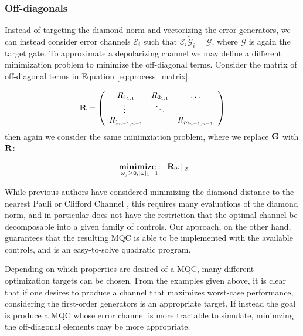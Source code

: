 \documentclass[aps,nofootinbib,pra,notitlepage,twocolumn]{revtex4-1}
\newcommand{\actual}{\ensuremath{\tilde{\mathcal{G}}}}
\newcommand{\target}{\ensuremath{{\mathcal{G}}}}
\newcommand{\error}{\ensuremath{{\mathcal{E}}}}
\begin{document}


\subsubsection{Off-diagonals} %
\label{sub:off_diagonals}
Instead of targeting the diamond norm and vectorizing the error generators, we can instead consider error channels $\error_i$ such that $\error_i\actual_i=\target$, where $\target$ is again the target gate. To approximate a depolarizing channel we may define a different minimization problem to  minimize the off-diagonal terms. Consider the matrix of off-diagonal terms in Equation \ref{eq:process_matrix}:

\begin{equation}\label{eq:vectorized_off_diagonal}
	\bold{R} = \left(\begin{array}{cccc}
		R_{1_{1,1}} & R_{2_{1,1}} & \ldots   \\ 
		\vdots\ & \ddots &    \\
		R_{1_{n-1,n-1}} &  &  R_{m_{n-1,n-1}} \\ 
	\end{array} 	
	\right)
\end{equation}
then again we consider the same minimziation problem, where we replace $\bold{G}$ with $\bold{R}$:

\begin{equation}\label{eq:minimization_diagonal}
  \begin{split}
    &\underset{\omega_j\geq0, |\omega|_1=1}{\textbf{minimize}: } ||\bold{R}\omega||_2\\
  \end{split}
\end{equation}

While previous authors have considered minimizing the diamond distance to the nearest Pauli or Clifford Channel \cite{Magesan2013}, this requires many evaluations of the diamond norm, and in particular does not have the restriction that the optimal channel be decomposable into a given family of controls. Our approach, on the other hand, guarantees that the resulting MQC is able to be implemented with the available controls, and is an easy-to-solve quadratic program.

Depending on which properties are desired of a MQC, many different optimization targets can be chosen. From the examples given above, it is clear that if one desires to produce a channel that maximizes worst-case performance, considering the first-order generators is an appropriate target. If instead the goal is produce a MQC whose error channel is more tractable to simulate, minimzing the off-diagonal elements may be more appropriate.
\end{document}
